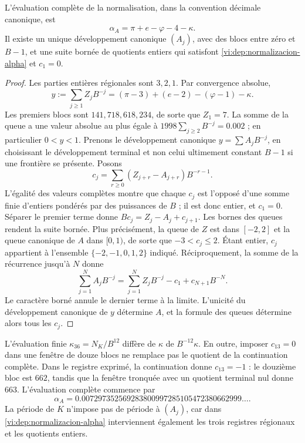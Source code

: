 \begin{theorem}
\label{vi:dep:alpha-completa}
L’évaluation complète de la normalisation, dans la convention décimale
canonique, est
\begin{equation}
 \alpha_A=\pi+e-\varphi-4-\kappa.
 \label{vi:dep:alpha-A}
\end{equation}
Il existe un unique développement canonique \((A_j)\), avec des blocs entre zéro
et \(B-1\), et une suite bornée de quotients entiers qui satisfont
\eqref{vi:dep:normalizacion-alpha} et \(c_1=0\).
\end{theorem}
\begin{proof}
Les parties entières régionales sont \(3,2,1\). Par convergence absolue,
\[
 y:=\sum_{j\ge1}Z_jB^{-j}
   =(\pi-3)+(e-2)-(\varphi-1)-\kappa.
\]
Les premiers blocs sont \(141,718,618,234\), de sorte que
\(Z_1=7\). La somme de la queue a une valeur absolue au plus
égale à \(1998\sum_{j\ge2}B^{-j}=0.002\) ; en particulier \(0<y<1\).
Prenons le développement canonique \(y=\sum A_jB^{-j}\), en choisissant le
développement terminal et non celui ultimement constant \(B-1\) si une
frontière se présente. Posons
\[
 c_j=\sum_{r\ge0}(Z_{j+r}-A_{j+r})B^{-r-1}.
\]
L’égalité des valeurs complètes montre que chaque \(c_j\) est
l’opposé d’une somme finie d’entiers pondérés par des puissances de
\(B\) ; il est donc entier, et \(c_1=0\). Séparer le premier terme
donne \(Bc_j=Z_j-A_j+c_{j+1}\). Les bornes des queues rendent la
suite bornée. Plus précisément, la queue de \(Z\) est dans \([-2,2]\)
et la queue canonique de \(A\) dans \([0,1)\), de sorte que
\(-3<c_j\le2\). Étant entier, \(c_j\) appartient à l’ensemble
\(\{-2,-1,0,1,2\}\) indiqué.
Réciproquement, la somme de la récurrence jusqu’à \(N\) donne
\[
 \sum_{j=1}^N A_jB^{-j}
 =\sum_{j=1}^N Z_jB^{-j}-c_1+c_{N+1}B^{-N}.
\]
Le caractère borné annule le dernier terme à la limite. L’unicité du
développement canonique de \(y\) détermine \(A\), et la formule des queues
détermine alors tous les \(c_j\).
\end{proof}

L’évaluation finie \(\kappa_{36}=N_K/B^{12}\) diffère de
\(\kappa\) de \(B^{-12}\kappa\). En outre, imposer
\(c_{13}=0\) dans une fenêtre de douze blocs ne remplace pas le quotient
de la continuation complète. Dans le registre exprimé, la continuation
donne \(c_{13}=-1\) : le douzième bloc est \(662\), tandis que la
fenêtre tronquée avec un quotient terminal nul donne \(663\). L’évaluation
complète commence par
\[
 \alpha_A=0.007297352569283800997285105472380662999\ldots.
\]
La période de \(K\) n’impose pas de période à \((A_j)\), car dans
\eqref{vi:dep:normalizacion-alpha} interviennent également les trois
registres régionaux et les quotients entiers.

